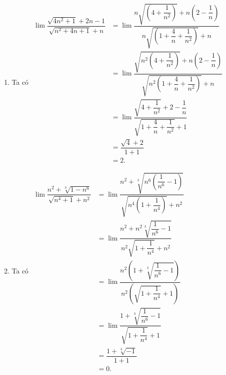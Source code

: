 \begin{ex}
{\begin{enumerate}
		\item Ta có $\begin{aligned}
		\lim \dfrac{\sqrt{4n^2+1}+2n-1}{\sqrt{n^2+4n+1}+n}&=\lim  \dfrac{n \sqrt{\left(4+\dfrac{1}{n^2}\right)}+n\left(2-\dfrac{1}{n}\right)}{n \sqrt{\left(1+\dfrac{4}{n}+\dfrac{1}{n^2}\right)}+n}\\
		&=\lim  \dfrac{\sqrt{n^2\left(4+\dfrac{1}{n^2}\right)}+n\left(2-\dfrac{1}{n}\right)}{\sqrt{n^2\left(1+\dfrac{4}{n}+\dfrac{1}{n^2}\right)}+n}\\
		 &=\lim \dfrac{\sqrt{4+\dfrac{1}{n^2}}+2-\dfrac{1}{n}}{\sqrt{1+\dfrac{4}{n}+\dfrac{1}{n^2}}+1}\\
		&=\dfrac{\sqrt{4}+2}{1+1}\\ 
		 &=2.
	\end{aligned}$
	\item Ta có $\begin{aligned}
	\lim  \dfrac{n^2+\sqrt[3]{1-n^6}}{\sqrt{n^4+1}+n^2}&=\lim \dfrac{n^2+\sqrt[3]{n^6\left(\dfrac{1}{n^6}-1\right)}}{\sqrt{n^4\left(1+\dfrac{1}{n^4}\right)}+n^2}\\
	&=\lim  \dfrac{n^2+n^2\sqrt[3]{\dfrac{1}{n^6}-1}}{n^2\sqrt{1+\dfrac{1}{n^4}}+n^2}\\
	&=\lim  \dfrac{n^2\left(1+\sqrt[3]{\dfrac{1}{n^6}-1}\right)}{n^2\left(\sqrt{1+\dfrac{1}{n^4}}+1\right)}\\
	 &=\lim \dfrac{1+\sqrt[3]{\dfrac{1}{n^6}-1}}{\sqrt{1+\dfrac{1}{n^4}}+1}\\
	 &=\dfrac{1+\sqrt[3]{-1}}{1+1}\\
	&=0. 
	\end{aligned}$
	\end{enumerate}
 }
\end{ex}


